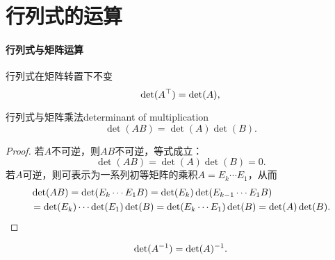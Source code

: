 \section{行列式的运算}
\paragraph{行列式与矩阵运算}
行列式在矩阵转置下不变
\[
	\det(A^\top)=\det(A),
\]
\begin{theorem}{行列式与矩阵乘法}{determinant of multiplication}
	\begin{equation}
		\det(AB)=\det(A)\det(B).
	\end{equation}
\end{theorem}
\begin{proof}
	若$A$不可逆，则$AB$不可逆，等式成立：
	\[
		\det(AB)=\det(A)\det(B)=0.
	\]
	若$A$可逆，则可表示为一系列初等矩阵的乘积$A=E_k\cdots E_1$，从而
	\begin{align*}
		&\det(AB)=\det(E_k\cdots E_1B)=\det(E_k)\det(E_{k-1}\cdots E_1B)\\
		&=\det(E_k)\cdots\det(E_1)\det(B)=\det(E_k\cdots E_1)\det(B)=\det(A)\det(B).
		\qedhere
	\end{align*}
\end{proof}
\begin{corollary}
	\begin{align}
		\det(A^{-1})=\det(A)^{-1}.
	\end{align}
\end{corollary}

